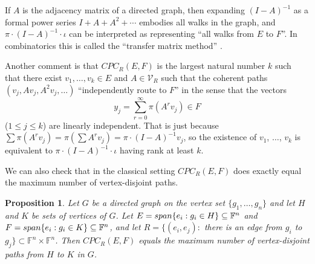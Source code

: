 \documentclass[10pt,a4paper]{amsart}
\newtheorem{prop}[thm]{Proposition}
\begin{document}
If $A$ is the adjacency matrix of a directed graph, then expanding $(I - A)^{-1}$ as a formal power series $I + A + A^2 + \cdots$ embodies all walks in the graph, and $\pi\cdot(I - A)^{-1}\cdot \iota$ can be interpreted as representing ``all walks from $E$ to $F$''. In combinatorics this is called the ``transfer matrix method'' \cite{stanley}.

Another comment is that $CPC_R(E,F)$ is the largest natural number $k$ such that there exist $v_1, \ldots, v_k \in E$ and $A \in \mathcal{V}_R$ such that the coherent paths $(v_j, Av_j, A^2 v_j, \ldots)$ ``independently route to $F$'' in the sense that the vectors $$y_j = \sum_{r = 0}^\infty \pi(A^r v_j) \in F$$ ($1 \leq j \leq k$) are linearly independent. That is just because $\sum \pi(A^r v_j) = \pi(\sum A^r v_j) = \pi\cdot(I - A)^{-1}v_j$, so the existence of $v_1$, $\ldots$, $v_k$ is equivalent to $\pi\cdot (I - A)^{-1}\cdot \iota$ having rank at least $k$.

We can also check that in the classical setting $CPC_R(E,F)$ does exactly equal the maximum number of vertex-disjoint paths.

\begin{prop}\label{gprop}
Let $G$ be a directed graph on the vertex set $\{g_1, \ldots, g_n\}$ and let $H$ and $K$ be sets of vertices of $G$. Let $E = {\rm span}\{e_i: g_i \in H\} \subseteq \mathbb{F}^n$ and $F = {\rm span}\{e_i: g_i \in K\} \subseteq \mathbb{F}^n$, and let $R = \{(e_i, e_j):$ there is an edge from $g_i$ to $g_j\} \subset \mathbb{F}^n\times \mathbb{F}^n$. Then $CPC_R(E, F)$ equals the maximum number of vertex-disjoint paths from $H$ to $K$ in $G$.
\end{prop}
\end{document}
